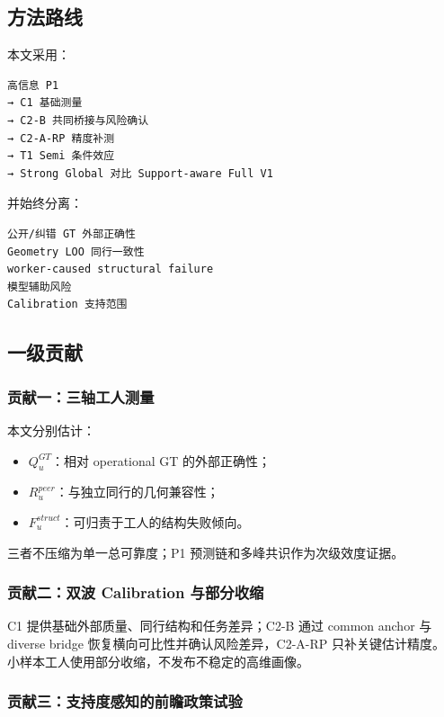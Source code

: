 \subsection{方法路线}

本文采用：

\begin{verbatim}
高信息 P1
→ C1 基础测量
→ C2-B 共同桥接与风险确认
→ C2-A-RP 精度补测
→ T1 Semi 条件效应
→ Strong Global 对比 Support-aware Full V1
\end{verbatim}

并始终分离：

\begin{verbatim}
公开/纠错 GT 外部正确性
Geometry LOO 同行一致性
worker-caused structural failure
模型辅助风险
Calibration 支持范围
\end{verbatim}

\subsection{一级贡献}

\subsubsection{贡献一：三轴工人测量}

本文分别估计：

\begin{itemize}
  \item $Q^{GT}_u$：相对 operational GT 的外部正确性；
  \item $R^{peer}_u$：与独立同行的几何兼容性；
  \item $F^{struct}_u$：可归责于工人的结构失败倾向。
\end{itemize}

三者不压缩为单一总可靠度；P1 预测链和多峰共识作为次级效度证据。

\subsubsection{贡献二：双波 Calibration 与部分收缩}

C1 提供基础外部质量、同行结构和任务差异；C2-B 通过 common anchor 与 diverse
bridge 恢复横向可比性并确认风险差异，C2-A-RP 只补关键估计精度。
小样本工人使用部分收缩，不发布不稳定的高维画像。

\subsubsection{贡献三：支持度感知的前瞻政策试验}

